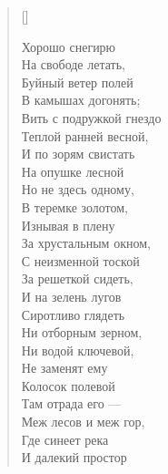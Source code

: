 \settowidth{\versewidth}{\vinНа свободе летать,}
\begin{verse}[\versewidth]
\begin{altverse}
Хорошо снегирю\\
На свободе летать,\\
Буйный ветер полей\\
В камышах догонять;\\
Вить с подружкой гнездо\\
Теплой ранней весной,\\
И по зорям свистать\\
На опушке лесной\ldotst\\
Но не здесь одному,\\
В теремке золотом,\\
Изнывая в плену\\
За хрустальным окном,\\
С неизменной тоской\\
За решеткой сидеть,\\
И на зелень лугов\\
Сиротливо глядеть\ldotst\\
Ни отборным зерном,\\
Ни водой ключевой,\\
Не заменят ему\\
Колосок полевой\ldotst\\
Там отрада его ---\\
Меж лесов и меж гор,\\
Где синеет река\\
И далекий простор\ldotst
\end{altverse}
\end{verse}

\newpage
\vspace*{0cm}




